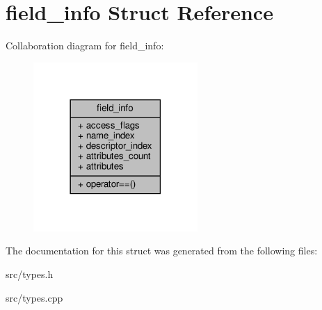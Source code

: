 \hypertarget{structfield__info}{}\section{field\+\_\+info Struct Reference}
\label{structfield__info}


Collaboration diagram for field\+\_\+info\+:
\nopagebreak
\begin{figure}[H]
\begin{center}
\leavevmode
\includegraphics[width=177pt]{structfield__info__coll__graph}
\end{center}
\end{figure}


The documentation for this struct was generated from the following files\+:\begin{DoxyCompactItemize}
\item 
src/types.\+h\item 
src/types.\+cpp\end{DoxyCompactItemize}
